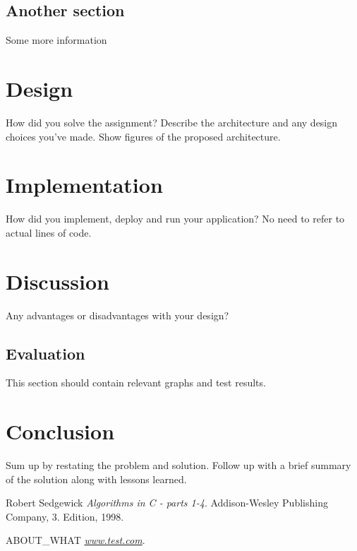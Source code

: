 \subsection{Another section}

Some more information

\section{Design}

How did you solve the assignment? Describe the architecture and any design choices you've made. Show figures of the proposed architecture.

\section{Implementation}

How did you implement, deploy and run your application? No need to refer to actual lines of code.

\section{Discussion}

Any advantages or disadvantages with your design?

\subsection{Evaluation}

This section should contain relevant graphs and test results.

\section{Conclusion}

Sum up by restating the problem and solution. Follow up with a brief summary of the solution along with lessons learned.



\newpage{}


\begin{thebibliography}{9}

 Robert Sedgewick 
  \emph{Algorithms in C - parts 1-4}.
  Addison-Wesley Publishing Company,
  3. Edition,
  1998.

 ABOUT_WHAT
  \emph{\url{www.test.com}}.

\end{thebibliography}


